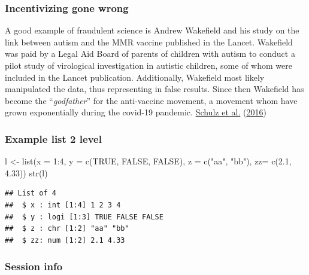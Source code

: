 \documentclass[
  12pt,
  norsk,
]{article}
\newenvironment{Shaded}{\begin{snugshade}}{\end{snugshade}}
\newcommand{\AttributeTok}[1]{\textcolor[rgb]{0.77,0.63,0.00}{#1}}
\newcommand{\ConstantTok}[1]{\textcolor[rgb]{0.00,0.00,0.00}{#1}}
\newcommand{\DecValTok}[1]{\textcolor[rgb]{0.00,0.00,0.81}{#1}}
\newcommand{\FloatTok}[1]{\textcolor[rgb]{0.00,0.00,0.81}{#1}}
\newcommand{\FunctionTok}[1]{\textcolor[rgb]{0.00,0.00,0.00}{#1}}
\newcommand{\NormalTok}[1]{#1}
\newcommand{\OtherTok}[1]{\textcolor[rgb]{0.56,0.35,0.01}{#1}}
\newcommand{\SpecialCharTok}[1]{\textcolor[rgb]{0.00,0.00,0.00}{#1}}
\newcommand{\StringTok}[1]{\textcolor[rgb]{0.31,0.60,0.02}{#1}}
\begin{document}
\hypertarget{incentivizing-gone-wrong}{%
\subsubsection{Incentivizing gone
wrong}\label{incentivizing-gone-wrong}}

A good example of fraudulent science is Andrew Wakefield and his study
on the link between autism and the MMR vaccine published in the Lancet.
Wakefield was paid by a Legal Aid Board of parents of children with
autism to conduct a pilot study of virological investigation in autistic
children, some of whom were included in the Lancet publication.
Additionally, Wakefield most likely manipulated the data, thus
representing in false results. Since then Wakefield has become the
``\emph{godfather}'' for the anti-vaccine movement, a movement whom have
grown exponentially during the covid-19 pandemic.
\protect\hyperlink{ref-schulz2016}{Schulz et al.}
(\protect\hyperlink{ref-schulz2016}{2016})

\hypertarget{example-list-2-level}{%
\subsubsection{Example list 2 level}\label{example-list-2-level}}

\begin{Shaded}
\begin{Highlighting}[]
\NormalTok{l }\OtherTok{\textless{}{-}} \FunctionTok{list}\NormalTok{(}\AttributeTok{x =} \DecValTok{1}\SpecialCharTok{:}\DecValTok{4}\NormalTok{, }\AttributeTok{y =} \FunctionTok{c}\NormalTok{(}\ConstantTok{TRUE}\NormalTok{, }\ConstantTok{FALSE}\NormalTok{, }\ConstantTok{FALSE}\NormalTok{), }\AttributeTok{z =} \FunctionTok{c}\NormalTok{(}\StringTok{"aa"}\NormalTok{, }\StringTok{"bb"}\NormalTok{), }\AttributeTok{zz=} \FunctionTok{c}\NormalTok{(}\FloatTok{2.1}\NormalTok{, }\FloatTok{4.33}\NormalTok{))}
\FunctionTok{str}\NormalTok{(l)}
\end{Highlighting}
\end{Shaded}

\begin{verbatim}
## List of 4
##  $ x : int [1:4] 1 2 3 4
##  $ y : logi [1:3] TRUE FALSE FALSE
##  $ z : chr [1:2] "aa" "bb"
##  $ zz: num [1:2] 2.1 4.33
\end{verbatim}

\hypertarget{session-info}{%
\subsubsection{Session info}\label{session-info}}
\end{document}
